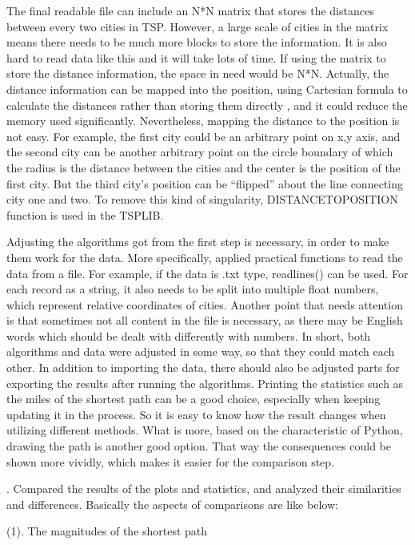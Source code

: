 \documentclass{article}
\begin{document}
The final readable file can include an N*N matrix that stores the distances between every two cities in TSP. However, a large scale of cities in the matrix means there needs to be much more blocks to store the information. It is also hard to read data like this and it will take lots of time. If using the matrix to store the distance information, the space in need would be N*N. 
Actually, the distance information can be mapped into the position, using Cartesian formula to calculate the distances rather than storing them directly \citep{database}, and it could reduce the memory used significantly. Nevertheless, mapping the distance to the position is not easy. For example, the first city could be an arbitrary point on x,y axis, and the second city can be another arbitrary point on the circle boundary of which the radius is the distance between the cities and the center is the position of the first city. But the third city's position can be “flipped” about the line connecting city one and two. To remove this kind of singularity, DISTANCETOPOSITION function is used in the TSPLIB\citep{datafunction}.

Adjusting the algorithms got from the first step is necessary, in order to make them work for the data. More specifically, applied practical functions to read the data from a file. For example, if the data is .txt type, readlines() can be used. For each record as a string, it also needs to be split into multiple float numbers, which represent relative coordinates of cities. Another point that needs attention is that sometimes not all content in the file is necessary, as there may be English words which should be dealt with differently with numbers. In short, both algorithms and data were adjusted in some way, so that they could match each other. 
In addition to importing the data, there should also be adjusted parts for exporting the results after running the algorithms. Printing the statistics such as the miles of the shortest path can be a good choice, especially when keeping updating it in the process. So it is easy to know how the result changes when utilizing different methods. What is more, based on the characteristic of Python, drawing the path is another good option. That way the consequences could be shown more vividly, which makes it easier for the comparison step.

. Compared the results of the plots and statistics, and analyzed their similarities and differences. Basically the aspects of comparisons are like below:

(1). The magnitudes of the shortest path
\end{document}
